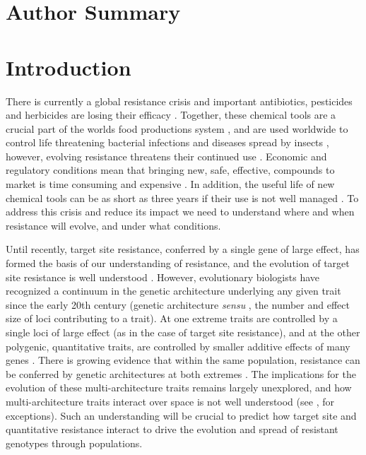 \documentclass[10pt,letterpaper]{article}
\begin{document}
\section*{Author Summary}

\linenumbers

\section*{Introduction}
There is currently a global resistance crisis \cite{Serv2013, Ross2014} and important antibiotics, pesticides and herbicides are losing their efficacy \cite{Palu2001}. Together, these chemical tools are a crucial part of the worlds food productions system \cite{Duke2012}, and are used worldwide to control life threatening bacterial infections and diseases spread by insects \cite{Nkya2013}, however, evolving resistance threatens their continued use \cite{Barb2011, Nkya2013}. Economic and regulatory conditions mean that bringing new, safe, effective, compounds to market is time consuming and expensive \cite{Duke2012}. In addition, the useful life of new chemical tools can be as short as three years if their use is not well managed \cite{Palu2001, Duke2012}. To address this crisis and reduce its impact we need to understand where and when resistance will evolve, and under what conditions. 

Until recently, target site resistance, conferred by a single gene of large effect, has formed the basis of our understanding of resistance, and the evolution of target site resistance is well understood \cite{Neve2007}. However, evolutionary biologists have recognized a continuum in the genetic architecture underlying any given trait since the early 20th century (genetic architecture \textit{sensu} \cite{Deba2015}, the number and effect size of loci contributing to a trait). At one extreme traits are controlled by a single loci of large effect (as in the case of target site resistance), and at the other polygenic, quantitative traits, are controlled by smaller additive effects of many genes \cite{Land1989, Mack2009, Rajo2013}. There is growing evidence that within the same population, resistance can be conferred by genetic architectures at both extremes \cite{Donn2009, Bing2011, Hend2013, Oake2013, Bauc2016}. The implications for the evolution of these multi-architecture traits remains largely unexplored, and how multi-architecture traits interact over space is not well understood (see \cite{Deba2015}, \cite{Yeam2015} for exceptions). Such an understanding will be crucial to predict how target site and quantitative resistance interact to drive the evolution and spread of resistant genotypes through populations.
\end{document}
